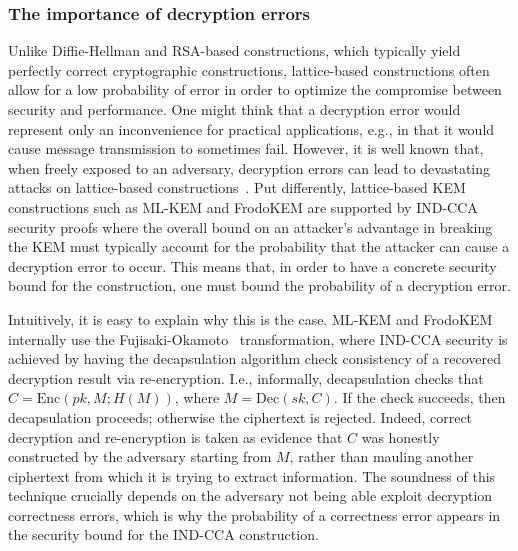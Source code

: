 \documentclass[conference,compsoc]{IEEEtran}
\begin{document}
\subsubsection*{The importance of decryption errors}
Unlike Diffie-Hellman and RSA-based constructions, which typically yield perfectly correct cryptographic constructions, lattice-based constructions often allow for a low probability of error in order to optimize the compromise between security and performance. 
One might think that a decryption error would represent only an inconvenience for practical applications, e.g., in that it would cause message transmission to sometimes fail.
However, it is well known that, when freely exposed to an adversary, decryption errors can lead to devastating attacks on lattice-based constructions~\cite{PKC:DAnBat22,PQCRYPTO:BinSch20,PKC:DGJNVV19b}. 
Put differently, lattice-based KEM  constructions such as ML-KEM and FrodoKEM are supported by IND-CCA security proofs where the overall bound on an attacker's advantage in breaking the KEM must typically account for the probability that the attacker can cause a decryption error to occur. This means that, in order to have a concrete security bound for the construction, one must bound the probability of a decryption error. 

Intuitively, it is easy to explain why this is the case. ML-KEM and FrodoKEM internally use the Fujisaki-Okamoto~\cite{} transformation, where IND-CCA security is achieved by having the decapsulation algorithm check consistency of a recovered decryption result via re-encryption. I.e., informally, decapsulation checks that $C = \mathrm{Enc}(pk,M;H(M))$, where $M = \mathrm{Dec}(sk,C)$. 
If the check succeeds, then decapsulation proceeds; otherwise the ciphertext is rejected.
Indeed, correct decryption and re-encryption is taken as evidence that $C$ was honestly constructed by the adversary starting from $M$, rather than mauling another ciphertext from which it is trying to extract information.
The soundness of this technique crucially depends on the adversary not being able exploit decryption correctness errors, which is why the probability of a correctness error appears in the security bound for the IND-CCA construction.
\end{document}

